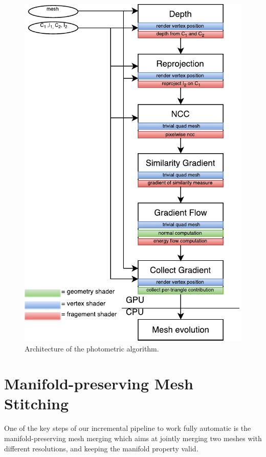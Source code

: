 \begin{figure}[tp]
\centering
\includegraphics[height=0.92\textheight]{./img/ch-incr-dens/incr-shaders-architecture}
\caption{Architecture of the photometric algorithm.}
\label{fig:openglIncrRef}
\end{figure}


\section{Manifold-preserving Mesh Stitching}
\label{sec:Mesh_merging}
One of the key steps of our incremental pipeline to work fully automatic is the manifold-preserving mesh merging which aims at jointly merging two meshes with different resolutions, and keeping the manifold property valid.

